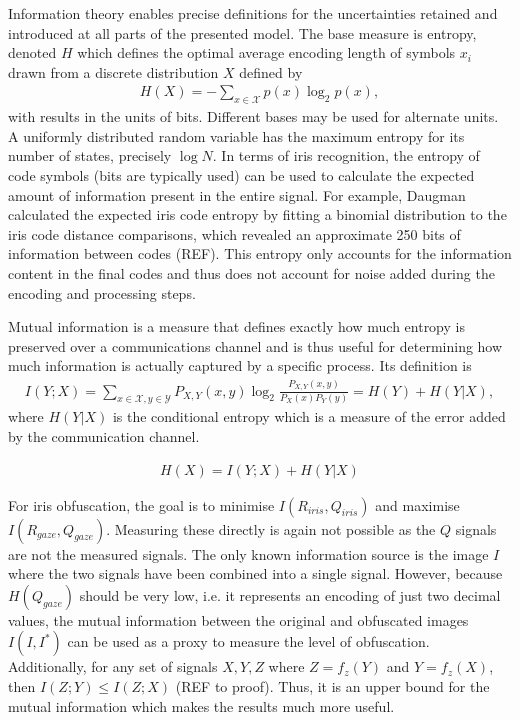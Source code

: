 Information theory enables precise definitions for the uncertainties retained and introduced at all parts of the presented model. The base measure is entropy, denoted $H$ which defines the optimal average encoding length of symbols $x_i$ drawn from a discrete distribution $X$ defined by
\begin{align}
    H(X) = -\sum_{x\in \mathcal{X}} p(x)\log_2p(x),
\end{align}
with results in the units of bits. Different bases may be used for alternate units. A uniformly distributed random variable has the maximum entropy for its number of states, precisely $\log{N}$. In terms of iris recognition, the entropy of code symbols (bits are typically used) can be used to calculate the expected amount of information present in the entire signal. For example, Daugman calculated the expected iris code entropy by fitting a binomial distribution to the iris code distance comparisons, which revealed an approximate 250 bits of information between codes (REF). This entropy only accounts for the information content in the final codes and thus does not account for noise added during the encoding and processing steps. 

Mutual information is a measure that defines exactly how much entropy is preserved over a communications channel and is thus useful for determining how much information is actually captured by a specific process. Its definition is 
\begin{align}
    I(Y;X) = \sum_{x\in \mathcal{X}, y\in \mathcal{Y}} P_{X,Y}(x, y)\log_2 \frac{P_{X,Y}(x, y)}{P_{X}(x)P_{Y}(y)} = H(Y) + H(Y|X),
\end{align}
where $H(Y|X)$ is the conditional entropy which is a measure of the error added by the communication channel.

\begin{align}\label{eq:entropy-law}
    H(X) = I(Y;X)+H(Y|X)
\end{align}

For iris obfuscation, the goal is to minimise $I(R_{iris}, Q_{iris})$ and maximise $I(R_{gaze}, Q_{gaze})$. Measuring these directly is again not possible as the $Q$ signals are not the measured signals. The only known information source is the image $I$ where the two signals have been combined into a single signal. However, because $H(Q_{gaze})$ should be very low, i.e. it represents an encoding of just two decimal values, the mutual information between the original and obfuscated images $I(I, I^*)$ can be used as a proxy to measure the level of obfuscation. Additionally, for any set of signals $X, Y, Z$ where $Z = f_z(Y)$ and $Y= f_z(X)$, then $I(Z; Y) \leq I(Z;X)$ (REF to proof). Thus, it is an upper bound for the mutual information which makes the results much more useful.

